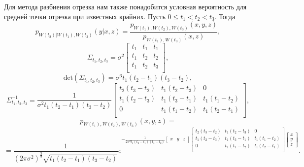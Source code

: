 \documentclass{article}
\theoremstyle{definition}
\begin{document}
Для метода разбиения отрезка нам также понадобится условная вероятность для средней точки отрезка при известных крайних. Пусть $0 \leqslant t_1 < t_2 < t_3$. Тогда
$$p_{W(t_2)|W(t_1),W(t_3)}(y|x,z) = \frac{p_{W(t_1),W(t_2),W(t_3)}(x,y,z)}{p_{W(t_1),W(t_3)}(x,z)},$$
$$\Sigma_{t_1, t_2, t_3} = \sigma^2\begin{bmatrix}
t_1 & t_1 & t_1\\
t_1 & t_2 & t_2\\
t_1 & t_2 & t_3\\
\end{bmatrix},$$
$$\text{det}(\Sigma_{t_1, t_2, t_3}) = \sigma^6t_1(t_2 - t_1)(t_3 - t_2),$$
$$\Sigma_{t_1, t_2, t_3}^{-1} = \frac{1}{\sigma^2t_1(t_2 - t_1)(t_3 - t_2)}\begin{bmatrix}
t_2(t_3 - t_2) & t_1(t_2 - t_3) & 0\\
t_1(t_2 - t_3) & t_1(t_3 - t_1) & t_1(t_1 - t_2)\\
0 & t_1(t_1 - t_2) & t_1(t_2 - t_1)\\
\end{bmatrix},$$
$$p_{W(t_1),W(t_2),W(t_3)}(x,y,z) = $$
$$ = \frac{1}{\left(2\pi\sigma^2\right)^{\frac{3}{2}}\sqrt{t_1(t_2 - t_1)(t_3 - t_2)}}e^{-\frac{1}{2\sigma^2t_1(t_2 - t_1)(t_3 - t_2)}\begin{bmatrix}x & y & z\end{bmatrix}\begin{bmatrix}
t_2(t_3 - t_2) & t_1(t_2 - t_3) & 0\\
t_1(t_2 - t_3) & t_1(t_3 - t_1) & t_1(t_1 - t_2)\\
0 & t_1(t_1 - t_2) & t_1(t_2 - t_1)\\
\end{bmatrix}\begin{bmatrix}x \\ y \\ z\end{bmatrix}}.$$
\end{document}
